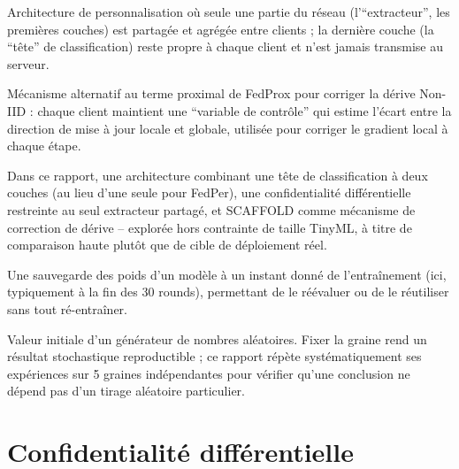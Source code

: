 \documentclass[11pt]{article}
\begin{document}
\begin{description}[leftmargin=0em, style=nextline]
\item[FedPer] Architecture de personnalisation où seule une partie du réseau
(l'``extracteur'', les premières couches) est partagée et agrégée entre clients ; la
dernière couche (la ``tête'' de classification) reste propre à chaque client et n'est
jamais transmise au serveur.

\item[SCAFFOLD] Mécanisme alternatif au terme proximal de FedProx pour corriger la
dérive Non-IID : chaque client maintient une ``variable de contrôle'' qui estime l'écart
entre la direction de mise à jour locale et globale, utilisée pour corriger le gradient
local à chaque étape.

\item[FedRep+SCAFFOLD] Dans ce rapport, une architecture combinant une tête de
classification à deux couches (au lieu d'une seule pour FedPer), une confidentialité
différentielle restreinte au seul extracteur partagé, et SCAFFOLD comme mécanisme de
correction de dérive -- explorée hors contrainte de taille TinyML, à titre de comparaison
haute plutôt que de cible de déploiement réel.

\item[Checkpoint] Une sauvegarde des poids d'un modèle à un instant donné de
l'entraînement (ici, typiquement à la fin des 30 rounds), permettant de le réévaluer ou
de le réutiliser sans tout ré-entraîner.

\item[Graine (\textit{seed})] Valeur initiale d'un générateur de nombres aléatoires.
Fixer la graine rend un résultat stochastique reproductible ; ce rapport répète
systématiquement ses expériences sur 5 graines indépendantes pour vérifier qu'une
conclusion ne dépend pas d'un tirage aléatoire particulier.

\end{description}

\section{Confidentialité différentielle}
\end{document}
